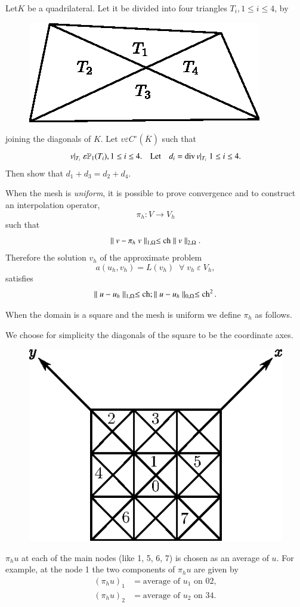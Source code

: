 \setcounter{exercise}{0}
\begin{exercise}\label{chap6:exr1}
Let\pageoriginale $K$ be a quadrilateral. Let it be divided into four
triangles $T_i, 1\leq i\leq 4$, by 
\begin{figure}[H]
\centering
\includegraphics{figure/fig6.2.eps}
\caption{}\label{fig6.2}
\end{figure}
\noindent
joining the diagonals of $K$. Let $v\varepsilon C^\circ(\overline{K})$
such that 
$$
v|_{T_i}\;\varepsilon\mathbb{P}_1(T_i), 1\leq i\leq
4.\quad\text{Let}\quad d_i=\operatorname{div} v|_{T_i}\;1\leq i\leq 4.
$$
Then show that $d_1+d_3=d_2+d_4$.

When the mesh is \emph{uniform}, it is possible to prove convergence
and to construct an interpolation operator,
$$
\pi_h:V\to V_h
$$
such that 
$$
\parallel v-\pi_h\;v\parallel_{1,\Omega}\leq \operatorname{ch}\parallel
v\parallel_{2,\Omega}.
$$
Therefore the solution $v_h$ of the approximate problem 
$$
a(u_h, v_h)=L(v_h)\;\; \forall\;v_h\;\varepsilon\;V_h,
$$
satisfies
$$
\parallel u-u_h\parallel_{1,\Omega}\leq\operatorname{ch};\parallel
u-u_h\parallel_{0,\Omega}\leq \operatorname{ch}^2.
$$

When the domain is a square and the mesh is uniform we define $\pi_h$
as follows.

We choose for simplicity the diagonals of the square to be the
coordinate axes.
\begin{figure}[H]
\centering
\includegraphics{figure/fig6.3.eps}
\caption{}\label{fig6.3}
\end{figure}\pageoriginale
\noindent
$\pi_hu$ at each of the main nodes (like 1, 5, 6, 7) is chosen as an
average of $u$. For example, at the node 1 the two components of
$\pi_hu$ are given by 
\begin{align*}
(\pi_hu)_1 &= \text{average of } u_1\text{ on } 02,\\
(\pi_hu)_2 &= \text{average of } u_2\text{ on } 34.
\end{align*}


\end{exercise}
